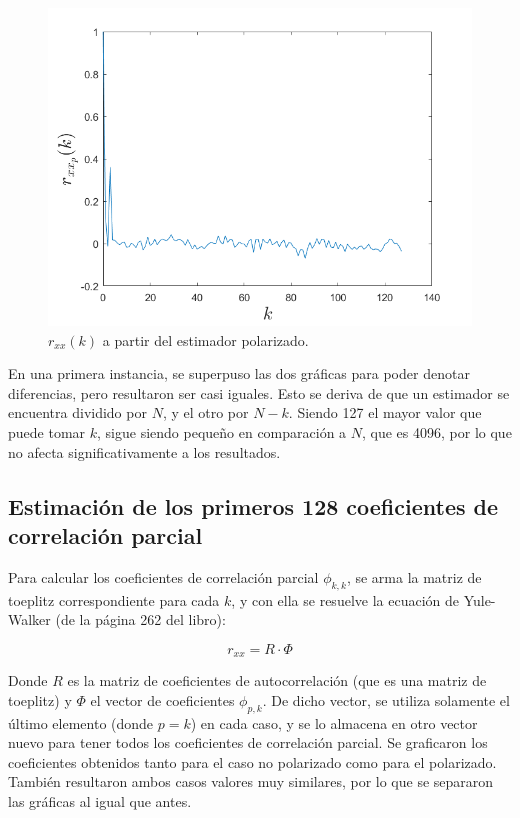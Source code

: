 \begin{figure}[H] %
\centering
\includegraphics[scale=0.45]{../EJ1/rxxP}
\caption{$r_{xx}(k)$ a partir del estimador polarizado.}
\label{rxxP}
\end{figure}

En una primera instancia, se superpuso las dos gráficas para poder denotar diferencias, pero resultaron ser casi iguales. Esto se deriva de que un estimador se encuentra dividido por $N$, y el otro por $N-k$. Siendo 127 el mayor valor que puede tomar $k$, sigue siendo pequeño en comparación a $N$, que es 4096, por lo que no afecta significativamente a los resultados. 

\newpage

\subsection{Estimaci\'on de los primeros 128 coeficientes de correlaci\'on parcial}

Para calcular los coeficientes de correlación parcial $\phi_{k,k}$, se arma la matriz de toeplitz correspondiente para cada $k$, y con ella se resuelve la ecuación de Yule-Walker (de la página 262 del libro):

\[
r_{xx} = R \cdot \Phi
\]

Donde $R$ es la matriz de coeficientes de autocorrelación (que es una matriz de toeplitz) y $\Phi$ el vector de coeficientes $\phi_{p,k}$. De dicho vector, se utiliza solamente el último elemento (donde $p=k$) en cada caso, y se lo almacena en otro vector nuevo para tener todos los coeficientes de correlación parcial. Se graficaron los coeficientes obtenidos tanto para el caso no polarizado como para el polarizado. También resultaron ambos casos valores muy similares, por lo que se separaron las gráficas al igual que antes.


